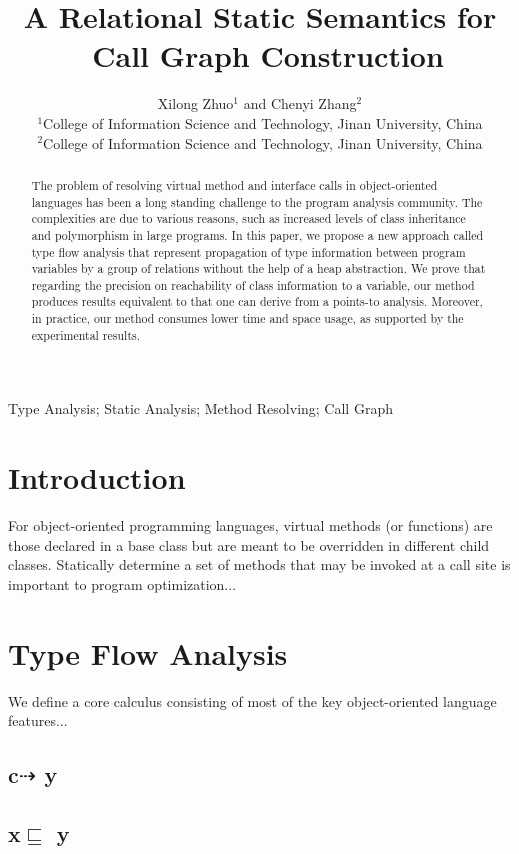 \documentclass{fac}
\title{A Relational Static Semantics for\\
		\ Call Graph Construction}
\author[Xilong Zhuo and Chenyi Zhang]
    {Xilong Zhuo$^1$ and Chenyi Zhang$^2$\\
     $^1$College of Information Science and Technology, Jinan University, China\\
     $^2$College of Information Science and Technology, Jinan University, China}
\newcommand{\less}{\sqsubseteq}
\newcommand{\tflow}{\dashrightarrow}
\begin{document}
\label{firstpage}

\makecorrespond

\maketitle

\begin{abstract}
The problem of resolving virtual method and interface calls in object-oriented languages has been a long standing challenge to the program analysis community. The complexities are due to various reasons, such as increased levels of class inheritance and polymorphism in large programs. In this paper, we propose a new approach called type flow analysis that represent propagation of type information between program variables by a group of relations without the help of a heap abstraction. We prove that regarding the precision on reachability of class information to a variable, our method produces results equivalent to that one can derive from a points-to analysis. Moreover, in practice, our method consumes lower time and space usage, as supported by the experimental results.
\end{abstract}

\begin{keywords}
Type Analysis; Static Analysis; Method Resolving; Call Graph
\end{keywords}

\section{Introduction}\label{sec:introduction}

For object-oriented programming languages, virtual methods (or functions) are those declared in a base class but are meant to be overridden in different child classes. Statically determine a set of methods that may be invoked at a call site is important to program optimization...
\section{Type Flow Analysis}\label{sec:type-flow-analysis}
We define a core calculus consisting of most of the key object-oriented language features...
\subsection{c$\tflow$ y}
\subsection{x$\less$ y}
\end{document}
